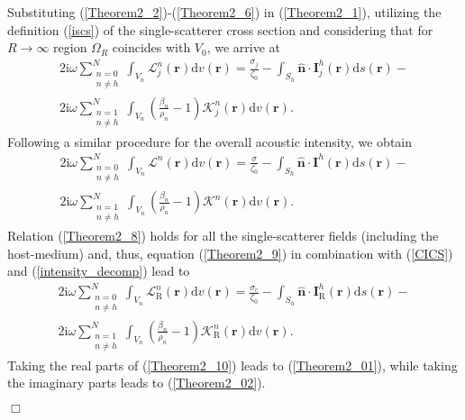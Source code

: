 \documentclass{article}
\begin{document}
Substituting (\ref{Theorem2_2})-(\ref{Theorem2_6}) in (\ref{Theorem2_1}), utilizing the definition (\ref{iscs}) of the single-scatterer cross section and considering that for $R\rightarrow\infty$ region $\Omega_R$ coincides with $V_0$, we arrive at
%
%
\begin{align}
    \nonumber
    2\mathrm{i}\omega\sum_{\substack{n=0\\n\ne h}}^{N}\int_{V_n}\mathcal{L}_j^n(\mathbf{r})\mathrm{d}v(\mathbf{r})=\frac{\sigma_j}{\zeta_0}-\int_{S_h}\hat{\mathbf{n}}\cdot\mathbf{I}_j^h(\mathbf{r})\mathrm{d}s(\mathbf{r})-\\2\mathrm{i}\omega\sum_{\substack{n=1\\n\ne h}}^{N}\int_{V_n}\left(\frac{\beta_n}{\rho_n}-1\right)\mathcal{K}_j^n(\mathbf{r})\mathrm{d}v(\mathbf{r}).
    \label{Theorem2_8}
\end{align}
%
Following a similar procedure for the overall acoustic intensity, we obtain
%
\begin{align} 
\nonumber
2\mathrm{i}\omega\sum_{\substack{n=0\\n\ne h}}^{N}\int_{V_n}\mathcal{L}^n(\mathbf{r})\mathrm{d}v(\mathbf{r})=\frac{\sigma}{\zeta_0}-\int_{S_h}\hat{\mathbf{n}}\cdot\mathbf{I}^{h}(\mathbf{r})\mathrm{d}s(\mathbf{r})-\\2\mathrm{i}\omega\sum_{\substack{n=1\\n\ne h}}^{N}\int_{V_n}\left(\frac{\beta_n}{\rho_n}-1\right)\mathcal{K}^n(\mathbf{r})\mathrm{d}v(\mathbf{r}).
\label{Theorem2_9}
\end{align}
%
Relation (\ref{Theorem2_8}) holds for all the single-scatterer fields (including the host-medium) and, thus, equation (\ref{Theorem2_9}) in combination with (\ref{CICS}) and (\ref{intensity_decomp}) lead to
%
\begin{align} \nonumber
2\mathrm{i}\omega\sum_{\substack{n=0\\n\ne h}}^{N}\int_{V_n}\mathcal{L}_{\mathrm{R}}^n(\mathbf{r})\mathrm{d}v(\mathbf{r})=\frac{\sigma_{\mathrm{c}}}{\zeta_0}-\int_{S_h}\hat{\mathbf{n}}\cdot\mathbf{I}_{\mathrm{R}}^{h}(\mathbf{r})\mathrm{d}s(\mathbf{r})-\\2\mathrm{i}\omega\sum_{\substack{n=1\\n\ne h}}^{N}\int_{V_n}\left(\frac{\beta_n}{\rho_n}-1\right)\mathcal{K}_{\mathrm{R}}^n(\mathbf{r})\mathrm{d}v(\mathbf{r}).\label{Theorem2_10}
\end{align}
Taking the real parts of (\ref{Theorem2_10}) leads to (\ref{Theorem2_01}), while taking the imaginary parts leads to (\ref{Theorem2_02}).
 \begin{flushright}$\Box$\end{flushright}
\end{document}
